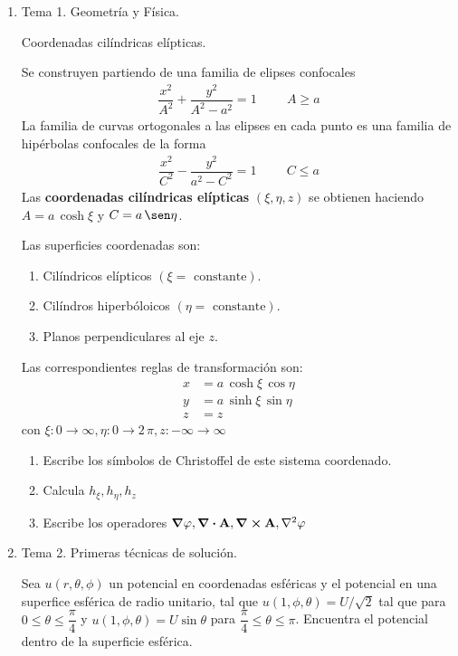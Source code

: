 \begin{enumerate}
\item Tema 1. Geometría y Física.
\par
Coordenadas cilíndricas elípticas.
\par
Se construyen partiendo de una familia de elipses confocales
\begin{align*}
\dfrac{x^{2}}{A^{2}} +  \dfrac{y^{2}}{A^{2} - a^{2}} =  1 \hspace{1cm} A \geq a
\end{align*}
La familia de curvas ortogonales a las elipses en cada punto es una familia de hipérbolas confocales de la forma
\begin{align*}
\dfrac{x^{2}}{C^{2}} - \dfrac{y^{2}}{a^{2} - C^{2}} = 1 \hspace{1cm} C \leq a
\end{align*}
Las \textbf{coordenadas cilíndricas elípticas} $(\xi, \eta, z)$ se obtienen haciendo $A = a \, \cosh \xi$ y $C = a \, \sen \eta$.
\par
Las superficies coordenadas son:
\begin{enumerate}[label=\alph*)]
\item Cilíndricos elípticos $(\xi = \mbox{ constante})$.
\item Cilíndros hiperbóloicos $(\eta = \mbox{ constante})$.
\item Planos perpendiculares al eje $z$.
\end{enumerate}
Las correspondientes reglas de transformación son:
\begin{align*}
x &= a \, \cosh \xi \, \cos \eta \\
y &= a \, \sinh \xi \, \sin \eta \\
z &= z
\end{align*}
con $\xi: 0 \to \infty, \eta: 0 \to 2 \, \pi, z: -\infty \to \infty$
\begin{enumerate}[label=\roman*.]
\item Escribe los símbolos de Christoffel de este sistema coordenado.
\item Calcula $h_{\xi}, h_{\eta}, h_{z}$
\item Escribe los operadores $\grad{\varphi}, \div{\vb{A}}, \curl \vb{A}, \laplacian{\varphi}$
\end{enumerate}
\item Tema 2. Primeras técnicas de solución.
\par
Sea $u(r, \theta, \phi)$ un potencial en coordenadas esféricas y el potencial en una superfice esférica de radio unitario, tal que $u(1, \phi, \theta) = U / \sqrt{2}$ tal que para $0 \leq \theta \leq \dfrac{\pi}{4}$ y $u(1, \phi, \theta) = U \sin \theta$ para $\dfrac{\pi}{4} \leq \theta \leq \pi$. Encuentra el potencial dentro de la superficie esférica.

\end{enumerate}

